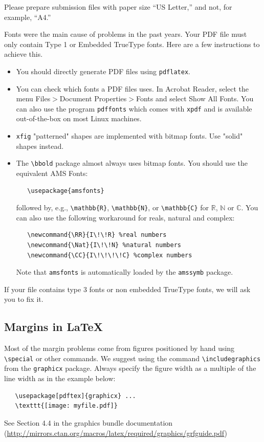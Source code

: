 \documentclass{article}
\begin{document}
Please prepare submission files with paper size ``US Letter,'' and not, for
example, ``A4.''


Fonts were the main cause of problems in the past years. Your PDF file must only
contain Type 1 or Embedded TrueType fonts. Here are a few instructions to
achieve this.


\begin{itemize}


\item You should directly generate PDF files using \verb+pdflatex+.


\item You can check which fonts a PDF files uses.  In Acrobat Reader, select the
  menu Files$>$Document Properties$>$Fonts and select Show All Fonts. You can
  also use the program \verb+pdffonts+ which comes with \verb+xpdf+ and is
  available out-of-the-box on most Linux machines.


\item \verb+xfig+ "patterned" shapes are implemented with bitmap fonts.  Use
  "solid" shapes instead.


\item The \verb+\bbold+ package almost always uses bitmap fonts.  You should use
  the equivalent AMS Fonts:
\begin{verbatim}
   \usepackage{amsfonts}
\end{verbatim}
followed by, e.g., \verb+\mathbb{R}+, \verb+\mathbb{N}+, or \verb+\mathbb{C}+
for $\mathbb{R}$, $\mathbb{N}$ or $\mathbb{C}$.  You can also use the following
workaround for reals, natural and complex:
\begin{verbatim}
   \newcommand{\RR}{I\!\!R} %real numbers
   \newcommand{\Nat}{I\!\!N} %natural numbers
   \newcommand{\CC}{I\!\!\!\!C} %complex numbers
\end{verbatim}
Note that \verb+amsfonts+ is automatically loaded by the \verb+amssymb+ package.


\end{itemize}


If your file contains type 3 fonts or non embedded TrueType fonts, we will ask
you to fix it.


\subsection{Margins in \LaTeX{}}


Most of the margin problems come from figures positioned by hand using
\verb+\special+ or other commands. We suggest using the command
\verb+\includegraphics+ from the \verb+graphicx+ package. Always specify the
figure width as a multiple of the line width as in the example below:
\begin{verbatim}
   \usepackage[pdftex]{graphicx} ...
   \texttt{[image: myfile.pdf]}
\end{verbatim}
See Section 4.4 in the graphics bundle documentation
(\url{http://mirrors.ctan.org/macros/latex/required/graphics/grfguide.pdf})
\end{document}
